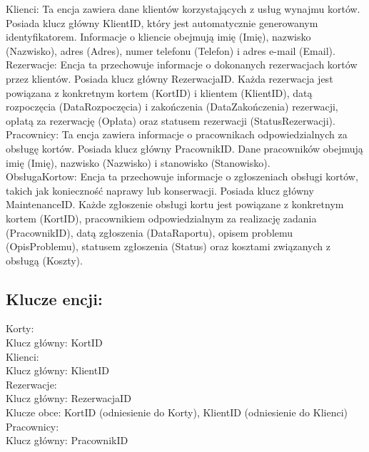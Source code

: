 \documentclass{article}
\begin{document}
\noindent
Klienci: Ta encja zawiera dane klientów korzystających z usług wynajmu kortów. Posiada klucz główny KlientID, który jest automatycznie generowanym identyfikatorem. Informacje o kliencie obejmują imię (Imię), nazwisko (Nazwisko), adres (Adres), numer telefonu (Telefon) i adres e-mail (Email).\\

\noindent
Rezerwacje: Encja ta przechowuje informacje o dokonanych rezerwacjach kortów przez klientów. Posiada klucz główny RezerwacjaID. Każda rezerwacja jest powiązana z konkretnym kortem (KortID) i klientem (KlientID), datą rozpoczęcia (DataRozpoczęcia) i zakończenia (DataZakończenia) rezerwacji, opłatą za rezerwację (Opłata) oraz statusem rezerwacji (StatusRezerwacji).\\

\noindent
Pracownicy: Ta encja zawiera informacje o pracownikach odpowiedzialnych za obsługę kortów. Posiada klucz główny PracownikID. Dane pracowników obejmują imię (Imię), nazwisko (Nazwisko) i stanowisko (Stanowisko).\\

\noindent
ObsługaKortow: Encja ta przechowuje informacje o zgłoszeniach obsługi kortów, takich jak konieczność naprawy lub konserwacji. Posiada klucz główny MaintenanceID. Każde zgłoszenie obsługi kortu jest powiązane z konkretnym kortem (KortID), pracownikiem odpowiedzialnym za realizację zadania (PracownikID), datą zgłoszenia (DataRaportu), opisem problemu (OpisProblemu), statusem zgłoszenia (Status) oraz kosztami związanych z obsługą (Koszty).\\

\subsection*{Klucze encji:}

Korty:\\
Klucz główny: KortID\\

\noindent
Klienci:\\
Klucz główny: KlientID\\

\noindent
Rezerwacje:\\
Klucz główny: RezerwacjaID\\
Klucze obce: KortID (odniesienie do Korty), KlientID (odniesienie do Klienci)\\

\noindent
Pracownicy:\\
Klucz główny: PracownikID\\
\end{document}
